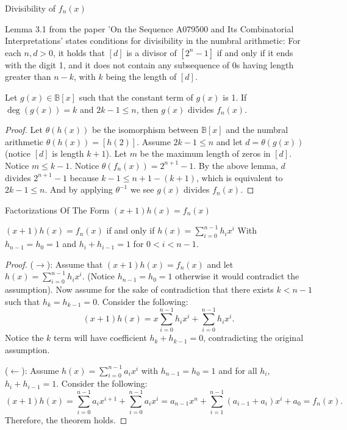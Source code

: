 \documentclass{beamer}
\newcommand{\B}{\mathbb{B}}
\begin{document}
    \begin{frame}[shrink=6]{Divisibility of $f_n(x)$}
        \begin{lemma}
            Lemma 3.1 from the paper 'On the Sequence A079500 and Its Combinatorial Interpretations' \cite{frosini2006sequence} 
            states conditions for divisibility in the numbral arithmetic: For each $n, d > 0$,
            it holds that $[d]$ is a divisor of $[2^n - 1]$ if and only if it ends with the digit 1,
            and it does not contain any subsequence of 0s having length greater than $n-k$, with $k$
            being the length of $[d]$.
        \end{lemma}
        \begin{theorem}
            Let $g(x) \in \B[x]$ such that the constant term of $g(x)$ is 1. If $\deg(g(x)) = k$
            and $2k-1 \leq n$, then $g(x)$ divides $f_n(x)$.
        \end{theorem}
        \begin{proof}
            Let $\theta(h(x))$ be the isomorphism between $\B[x]$ and the numbral arithmetic $\theta(h(x))= [h(2)]$.
            Assume $2k-1 \leq n$ and let $d = \theta(g(x))$ (notice $[d]$ is length $k+1$). Let $m$ be
            the maximum length of zeros in $[d]$. Notice $m \leq k-1$. Notice $\theta(f_n(x)) = 2^{n+1}-1$.
            By the above lemma, $d$ divides $2^{n+1}-1$ because $k-1 \leq n+1-(k+1)$, which is
            equivalent to $2k-1 \leq n$. And by applying $\theta^{-1}$ we see $g(x)$ divides $f_n(x)$.
        \end{proof} 

    \end{frame}


    \begin{frame}[shrink=15]{Factorizations Of The Form $(x+1)h(x)= f_n(x) $}
        \small
        \begin{theorem}
            $(x+1)h(x) = f_n(x)$ if and only if $ \displaystyle h(x) = \sum_{i=0}^{n-1}h_ix^i$ With $h_{n-1} = h_0 =  1$ and $h_{i}+h_{i-1} = 1$ for $0<i<n-1$. 
        \end{theorem}
        \begin{proof}
            \small
            ($\rightarrow$): Assume that $(x+1)h(x) = f_n(x)$ and let $h(x) = \sum_{i=0}^{n-1} h_i x^i$.
            (Notice $h_{n-1} = h_0 = 1$ otherwise it would contradict the assumption). Now assume
            for the sake of contradiction that there exists $k < n-1$ such that $h_k = h_{k-1} = 0$.
            Consider the following:
            \[(x+1)h(x) = x \sum_{i=0}^{n-1} h_i x^i + \sum_{i=0}^{n-1} h_i x^i.\]
            Notice the $k$ term will have coefficient $h_k + h_{k-1} = 0$,
            contradicting the original assumption.

            ($\leftarrow$): Assume $h(x) = \sum_{i=0}^{n-1} a_i x^i$ with $h_{n-1} = h_0 = 1$ and for
            all $h_i$,  $h_i+h_{i-1} = 1$. Consider the following:
            \[(x+1)h(x) = \sum_{i=0}^{n-1} a_i x^{i+1} + \sum_{i=0}^{n-1} a_i x^i = a_{n-1}x^n + \sum_{i=1}^{n-1}(a_{i-1}+a_i)x^i + a_0 = f_n(x).\]
            Therefore, the theorem holds.
        \end{proof}    
    \end{frame}
    
\end{document}
